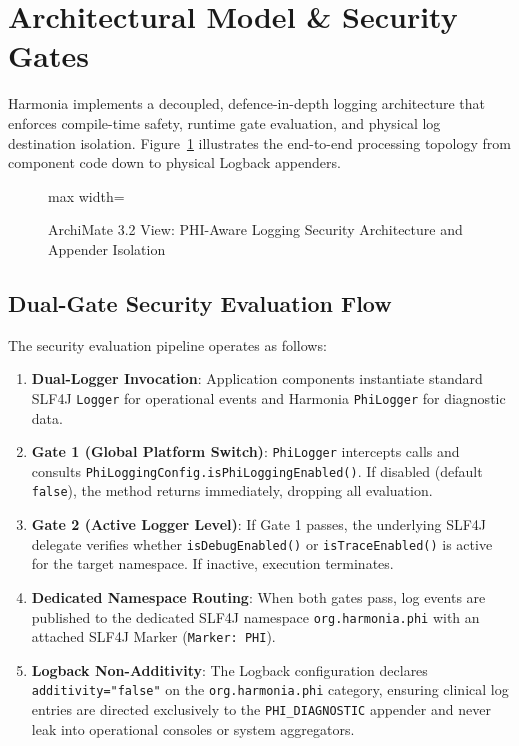 \section{Architectural Model \& Security Gates}
\label{sec:phi_arch_model}

Harmonia implements a decoupled, defence-in-depth logging architecture that enforces compile-time safety, runtime gate evaluation, and physical log destination isolation. Figure~\ref{fig:phi_logging_architecture_appendix} illustrates the end-to-end processing topology from component code down to physical Logback appenders.

\begin{figure}[htbp]
    \centering
    \begin{adjustbox}{max width=\textwidth}
        
    \end{adjustbox}
    \caption{ArchiMate 3.2 View: PHI-Aware Logging Security Architecture and Appender Isolation}
    \label{fig:phi_logging_architecture_appendix}
\end{figure}

\subsection{Dual-Gate Security Evaluation Flow}

The security evaluation pipeline operates as follows:
\begin{enumerate}
    \item \textbf{Dual-Logger Invocation}: Application components instantiate standard SLF4J \texttt{Logger} for operational events and Harmonia \texttt{PhiLogger} for diagnostic data.
    \item \textbf{Gate 1 (Global Platform Switch)}: \texttt{PhiLogger} intercepts calls and consults \texttt{PhiLoggingConfig.isPhiLoggingEnabled()}. If disabled (default \texttt{false}), the method returns immediately, dropping all evaluation.
    \item \textbf{Gate 2 (Active Logger Level)}: If Gate 1 passes, the underlying SLF4J delegate verifies whether \texttt{isDebugEnabled()} or \texttt{isTraceEnabled()} is active for the target namespace. If inactive, execution terminates.
    \item \textbf{Dedicated Namespace Routing}: When both gates pass, log events are published to the dedicated SLF4J namespace \texttt{org.harmonia.phi} with an attached SLF4J Marker (\texttt{Marker: PHI}).
    \item \textbf{Logback Non-Additivity}: The Logback configuration declares \texttt{additivity="false"} on the \texttt{org.harmonia.phi} category, ensuring clinical log entries are directed exclusively to the \texttt{PHI\_DIAGNOSTIC} appender and never leak into operational consoles or system aggregators.
\end{enumerate}

